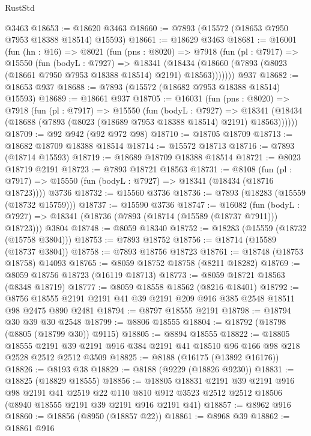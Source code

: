 \begin{lexlean}{RustStd}
\begin{coremodule}
    @3463
@18653 := @18620 @3463
@18660 := @7893 (@15572 (@18653 @7950 @7953 @18388 @18514) @15593)
@18661 := @18629 @3463
@18681 := @16001
    (fun (hn : @16) =>
    @8021
      (fun (pns : @8020) =>
      @7918
        (fun (pl : @7917) =>
        @15550
          (fun (bodyL : @7927) =>
          @18341
            (@18434 (@18660 (@7893 (@8023 (@18661 @7950 @7953 @18388 @18514) @2191) @18563)))))))
    @937
@18682 := @18653 @937
@18688 := @7893 (@15572 (@18682 @7953 @18388 @18514) @15593)
@18689 := @18661 @937
@18705 := @16031
    (fun (pns : @8020) =>
    @7918
      (fun (pl : @7917) =>
      @15550
        (fun (bodyL : @7927) =>
        @18341 (@18434 (@18688 (@7893 (@8023 (@18689 @7953 @18388 @18514) @2191) @18563))))))
@18709 := @92 @942 (@92 @972 @98)
@18710 := @18705 @18709
@18713 := @18682 @18709 @18388 @18514
@18714 := @15572 @18713
@18716 := @7893 (@18714 @15593)
@18719 := @18689 @18709 @18388 @18514
@18721 := @8023 @18719 @2191
@18723 := @7893 @18721 @18563
@18731 := @8108
    (fun (pl : @7917) => @15550 (fun (bodyL : @7927) => @18341 (@18434 (@18716 @18723))))
    @3736
@18732 := @15560 @3736
@18736 := @7893 (@18283 (@15559 (@18732 @15759)))
@18737 := @15590 @3736
@18747 := @16082
    (fun (bodyL : @7927) => @18341 (@18736 (@7893 (@18714 (@15589 (@18737 @7911))) @18723)))
    @3804
@18748 := @8059 @18340
@18752 := @18283 (@15559 (@18732 (@15758 @3804)))
@18753 := @7893 @18752
@18756 := @18714 (@15589 (@18737 @3804))
@18758 := @7893 @18756 @18723
@18761 := @18748 (@18753 @18758) @14093
@18765 := @8059 @18752 @18758 (@8211 @18282)
@18769 := @8059 @18756 @18723 (@16119 @18713)
@18773 := @8059 @18721 @18563 (@8348 @18719)
@18777 := @8059 @18558 @18562 (@8216 @18401)
@18792 := @8756 @18555 @2191 @2191 @41 @39 @2191 @209 @916 @385 @2548 @18511 @98 @2475 @890 @2481
@18794 := @8797 @18555 @2191
@18798 := @18794 @30 @39 @30 @2548
@18799 := @8806 @18555
@18804 := @18792 (@18798 (@8805 (@18799 @30)) @9115)
@18805 := @8894 @18555
@18822 := @18805
    @18555
    @2191
    @39
    @2191
    @916
    @384
    @2191
    @41
    @18510
    @96
    @166
    @98
    @218
    @2528
    @2512
    @2512
    @3509
@18825 := @8188 (@16175 (@13892 @16176))
@18826 := @8193 @38
@18829 := @8188 (@9229 (@18826 @9230))
@18831 := @18825 (@18829 @18555)
@18856 := @18805
    @18831
    @2191
    @39
    @2191
    @916
    @98
    @2191
    @41
    @2519
    @22
    @110
    @810
    @912
    @3523
    @2512
    @2512
    @18506
    (@8940 @18555 @2191 @39 @2191 @916 @2191 @41)
@18857 := @8962 @916
@18860 := @18856 (@8950 (@18857 @22))
@18861 := @8968 @39
@18862 := @18861 @916

\end{coremodule}
\end{lexlean}
